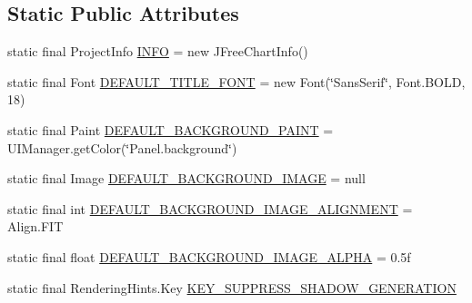\subsection*{Static Public Attributes}
\begin{DoxyCompactItemize}
\item 
static final Project\+Info \mbox{\hyperlink{classorg_1_1jfree_1_1chart_1_1_j_free_chart_a1d8ca055d857ca9dbe36334bd2f28929}{I\+N\+FO}} = new J\+Free\+Chart\+Info()
\item 
static final Font \mbox{\hyperlink{classorg_1_1jfree_1_1chart_1_1_j_free_chart_a640aa4dd676620a36764874737b77706}{D\+E\+F\+A\+U\+L\+T\+\_\+\+T\+I\+T\+L\+E\+\_\+\+F\+O\+NT}} = new Font(\char`\"{}Sans\+Serif\char`\"{}, Font.\+B\+O\+LD, 18)
\item 
static final Paint \mbox{\hyperlink{classorg_1_1jfree_1_1chart_1_1_j_free_chart_a25396f0fb7b1783f02f67922f9d527e4}{D\+E\+F\+A\+U\+L\+T\+\_\+\+B\+A\+C\+K\+G\+R\+O\+U\+N\+D\+\_\+\+P\+A\+I\+NT}} = U\+I\+Manager.\+get\+Color(\char`\"{}Panel.\+background\char`\"{})
\item 
static final Image \mbox{\hyperlink{classorg_1_1jfree_1_1chart_1_1_j_free_chart_a5efd57c25eaa7f190badf0612f50e252}{D\+E\+F\+A\+U\+L\+T\+\_\+\+B\+A\+C\+K\+G\+R\+O\+U\+N\+D\+\_\+\+I\+M\+A\+GE}} = null
\item 
static final int \mbox{\hyperlink{classorg_1_1jfree_1_1chart_1_1_j_free_chart_a6b0200d0f86fc2f6a3e239a01252fa31}{D\+E\+F\+A\+U\+L\+T\+\_\+\+B\+A\+C\+K\+G\+R\+O\+U\+N\+D\+\_\+\+I\+M\+A\+G\+E\+\_\+\+A\+L\+I\+G\+N\+M\+E\+NT}} = Align.\+F\+IT
\item 
static final float \mbox{\hyperlink{classorg_1_1jfree_1_1chart_1_1_j_free_chart_a3ee8b1881f510a53e079ee84695858d1}{D\+E\+F\+A\+U\+L\+T\+\_\+\+B\+A\+C\+K\+G\+R\+O\+U\+N\+D\+\_\+\+I\+M\+A\+G\+E\+\_\+\+A\+L\+P\+HA}} = 0.\+5f
\item 
static final Rendering\+Hints.\+Key \mbox{\hyperlink{classorg_1_1jfree_1_1chart_1_1_j_free_chart_a3b7afcb6e6f64645a1bc5ed2e9ff73e1}{K\+E\+Y\+\_\+\+S\+U\+P\+P\+R\+E\+S\+S\+\_\+\+S\+H\+A\+D\+O\+W\+\_\+\+G\+E\+N\+E\+R\+A\+T\+I\+ON}}
\end{DoxyCompactItemize}
